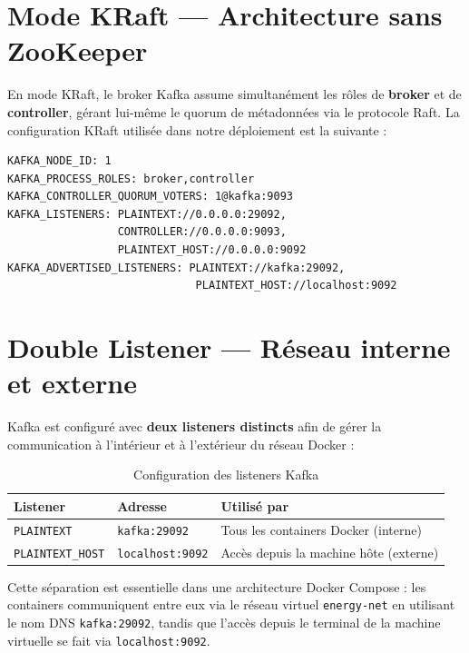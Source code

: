 \documentclass[12pt,a4paper]{report}
\begin{document}
\section{Mode KRaft — Architecture sans ZooKeeper}

En mode KRaft, le broker Kafka assume simultanément les rôles de \textbf{broker} et de
\textbf{controller}, gérant lui-même le quorum de métadonnées via le protocole Raft.
La configuration KRaft utilisée dans notre déploiement est la suivante :

\begin{lstlisting}[language=bash, caption={Configuration Kafka KRaft dans Docker Compose}]
KAFKA_NODE_ID: 1
KAFKA_PROCESS_ROLES: broker,controller
KAFKA_CONTROLLER_QUORUM_VOTERS: 1@kafka:9093
KAFKA_LISTENERS: PLAINTEXT://0.0.0.0:29092,
                 CONTROLLER://0.0.0.0:9093,
                 PLAINTEXT_HOST://0.0.0.0:9092
KAFKA_ADVERTISED_LISTENERS: PLAINTEXT://kafka:29092,
                             PLAINTEXT_HOST://localhost:9092
\end{lstlisting}

\section{Double Listener — Réseau interne et externe}

Kafka est configuré avec \textbf{deux listeners distincts} afin de gérer la communication
à l'intérieur et à l'extérieur du réseau Docker :

\begin{table}[H]
\centering
\begin{tabular}{|l|l|l|}
\hline
\textbf{Listener} & \textbf{Adresse} & \textbf{Utilisé par} \\
\hline
\texttt{PLAINTEXT} & \texttt{kafka:29092} & Tous les containers Docker (interne) \\
\hline
\texttt{PLAINTEXT\_HOST} & \texttt{localhost:9092} & Accès depuis la machine hôte (externe) \\
\hline
\end{tabular}
\caption{Configuration des listeners Kafka}
\label{tab:kafka_listeners}
\end{table}

Cette séparation est essentielle dans une architecture Docker Compose : les containers
communiquent entre eux via le réseau virtuel \texttt{energy-net} en utilisant le nom DNS
\texttt{kafka:29092}, tandis que l'accès depuis le terminal de la machine virtuelle se fait
via \texttt{localhost:9092}.
\end{document}
